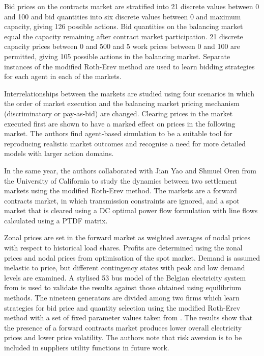 Bid prices on the contracts market are stratified into 21 discrete
values between 0 and 100 and bid quantities into six discrete values between 0
and maximum capacity, giving 126 possible actions.  Bid quantities on the
balancing market equal the capacity remaining after contract market
participation.  21 discrete capacity prices between 0 and 500 and 5 work prices
between 0 and 100 are permitted, giving 105 possible actions in the balancing
market.  Separate instances of the modified Roth-Erev method are used to learn
bidding strategies for each agent in each of the markets.

Interrelationships between the markets are studied using four scenarios in
which the order of market execution and the balancing market pricing mechanism
(discriminatory or pay-as-bid) are changed.  Clearing prices in the market
executed first are shown to have a marked effect on prices in the
following market.  The authors find agent-based simulation to be a suitable
tool for reproducing realistic market outcomes and recognise a need for more
detailed models with larger action domains.

In the same year, the authors collaborated with Jian Yao and Shmuel Oren from
the University of California to study the dynamics between two settlement
markets using the modified Roth-Erev method.  The markets are a forward
contracts market, in which transmission constraints are ignored, and a spot
market that is cleared using a DC optimal power flow formulation with line
flows calculated using a PTDF matrix.

Zonal prices are set in the forward market as weighted averages of nodal prices
with respect to historical load shares.  Profits are determined using the
zonal prices and nodal prices from optimisation of the spot market.  Demand is assumed
inelastic to price, but different contingency states with peak and low demand
levels are examined.  A stylised 53 bus model of the Belgian electricity
system from  is used to validate the results against those
obtained using equilibrium methods.  The nineteen generators are divided among
two firms which learn strategies for bid price and quantity selection using the
modified Roth-Erev method with a set of fixed parameter values taken from
.  The results show that the presence of a forward contracts
market produces lower overall electricity prices and lower price volatility.
The authors note that risk aversion is to be included in suppliers utility
functions in future work.

